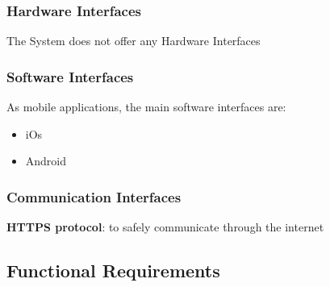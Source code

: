 \documentclass{article}
\begin{document}
\subsubsection{Hardware Interfaces}
The System does not offer any Hardware Interfaces
\subsubsection{Software Interfaces}
As mobile applications, the main software interfaces are:
\begin{itemize}
    \item iOs
    \item Android
\end{itemize}
\subsubsection {Communication Interfaces}
\textbf{HTTPS protocol}: to safely communicate through the internet

\subsection{Functional Requirements}
\end{document}
